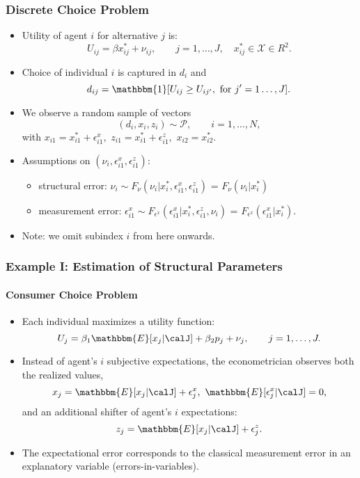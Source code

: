 \begin{frame}
\frametitle{Discrete Choice Problem}

\begin{itemize}
	\item Utility of agent $i$ for alternative $j$ is:
	\begin{equation*}
	U_{ij}=\beta x^{*}_{ij} + \nu_{ij},\qquad  j = 1,\dots,J,\quad x^{*}_{ij}\in\mathcal{X}\in R^{2}.
	\end{equation*}
	\item Choice of individual $i$ is captured in $d_{i}$ and
	\begin{equation*}
	d_{ij} = \mathbbm{1}[U_{ij}\geq U_{ij'},\text{ for $j'=1\dots,J$}].
	\end{equation*}
	\item We observe a random sample of vectors
	\begin{equation*}
	(d_{i},x_{i},z_{i})\sim\mathcal{P},\qquad i = 1,\dots,N,
	\end{equation*}
	with $x_{i1}=x^{*}_{i1}+\epsilon^{x}_{i1},$ $z_{i1}=x^{*}_{i1} + \epsilon^{z}_{i1},$ $x_{i2}=x^{*}_{i2}$.
	\item Assumptions on $(\nu_{i},\epsilon^{x}_{i1},\epsilon^{z}_{i1})$:
	\begin{itemize}
	\item structural error: $\nu_{i}\sim F_{\nu}(\nu_{i}|x_{i}^{*},\epsilon_{i1}^{x},\epsilon_{i1}^{z})$ = $F_{\nu}(\nu_{i}|x_{i}^{*})$
	\item measurement error: $\epsilon^{x}_{i1}\sim F_{\epsilon^{x}}(\epsilon_{i1}^{x}|x_{i}^{*},\epsilon_{i1}^{z},\nu_{i})$ = $F_{\epsilon^{x}}(\epsilon_{i1}^{x}|x_{i}^{*})$.
	\end{itemize}
	\item Note: we omit subindex $i$ from here onwards.
\end{itemize}
\end{frame}
\begin{frame}
\frametitle{Example I: Estimation of Structural Parameters}
\framesubtitle{Consumer Choice Problem}

\begin{itemize}
	\item Each individual maximizes a utility function:
	\begin{equation*}
	U_{j}=\beta_{1}\mathbbm{E}[x_{j}|\calJ] +\beta_{2}p_{j}+ \nu_{j},\qquad  j = 1,\dots,J.
	\end{equation*}
	\item Instead of agent's $i$ subjective expectations, the econometrician observes both the realized values,
	\begin{equation*}
	x_{j} = \mathbbm{E}[x_{j}|\calJ] + \epsilon^{x}_{j},\text{ $\mathbbm{E}[\epsilon^{x}_{j}|\calJ]=0$,}
	\end{equation*}
	and an additional shifter of agent's $i$ expectations:
	\begin{equation*}
	z_{j} = \mathbbm{E}[x_{j}|\calJ] + \epsilon^{z}_{j}.
	\end{equation*}
	\item The expectational error corresponds to the classical measurement error in an explanatory variable (errors-in-variables).
\end{itemize}
\end{frame}
